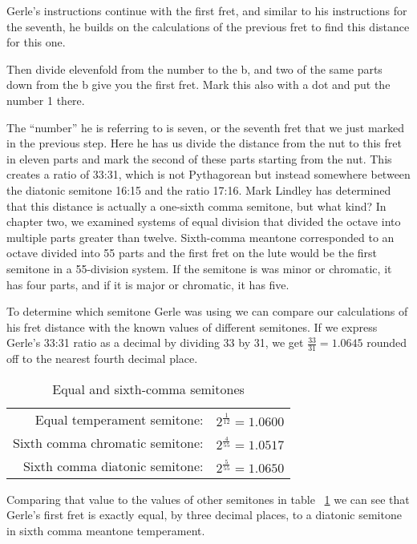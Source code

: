 Gerle's instructions continue with the first fret, and similar to his instructions for the
seventh, he builds on the calculations of the previous fret to find this distance for this
one.
\begin{blocks}
Then divide elevenfold from the number to the b, and two of the same parts down from the b
give you the first fret.  Mark this also with a dot and put the number 1 there.
\end{blocks}
The ``number'' he is referring to is seven, or the seventh fret that we just marked in the
previous step.  Here he has us divide the distance from the nut to this fret in eleven
parts and mark the second of these parts starting from the nut. This creates a ratio of
33:31, which is not Pythagorean but instead somewhere between the diatonic semitone
16:15 and the ratio 17:16. Mark Lindley has determined that this distance is actually a
one-sixth comma semitone, but what kind?  In chapter two, we examined systems of equal
division that divided the octave into multiple parts greater than twelve.  Sixth-comma
meantone corresponded to an octave divided into 55 parts and the first fret on the lute
would be the first semitone in a 55-division system.  If the semitone is was minor or
chromatic, it has four parts, and if it is major or chromatic, it has five.

To determine which semitone Gerle was using we can compare our calculations of his fret
distance with the known values of different semitones.  If we express Gerle's 33:31 ratio
as a decimal by dividing 33 by 31, we get $ \frac{33}{31} = 1.0645 $ rounded off
to the nearest fourth decimal place.
\begin{table}[h!]
    \begin{center}
    \begin{tabular}{ r l }
        Equal temperament semitone:     & $ 2^\frac{1}{12} = 1.0600 $ \\
        Sixth comma chromatic semitone: & $ 2^\frac{4}{55} = 1.0517 $ \\
        Sixth comma diatonic semitone:  & $ 2^\frac{5}{55} = 1.0650 $ \\
    \end{tabular}
    \end{center}
    \caption{Equal and sixth-comma semitones}
    \label{table:6semitones}
\end{table}
Comparing that value to the values of other semitones in table ~\ref{table:6semitones} we
can see that Gerle's first fret is exactly equal, by three decimal places, to a diatonic
semitone in sixth comma meantone temperament.

